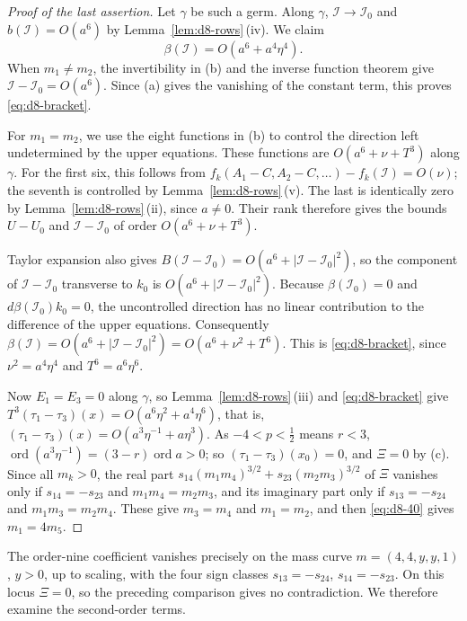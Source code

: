 \documentclass[11pt]{amsart}
\theoremstyle{definition}
\theoremstyle{remark}
\newcommand{\ord}{\operatorname{ord}}
\begin{document}
{}\begin{proof}[Proof of the last assertion]
Let $\gamma$ be such a germ.  Along $\gamma$, $\mathcal I\to\mathcal I_0$ and
$b(\mathcal I)=O(a^6)$ by Lemma~\ref{lem:d8-rows}\,(iv).  We claim
\begin{equation}\label{eq:d8-bracket}
  \beta(\mathcal I)=O(a^6+a^4\eta^4).
\end{equation}
When $m_1\ne m_2$, the invertibility in (b) and the inverse function theorem
give $\mathcal I-\mathcal I_0=O(a^6)$.  Since (a) gives the vanishing of the constant
term, this proves \eqref{eq:d8-bracket}.

For $m_1=m_2$, we use the eight functions in (b) to control the direction left
undetermined by the upper equations.  These functions are $O(a^6+\nu+T^3)$ along
$\gamma$.  For the first six, this follows from
$f_k(A_1-C,A_2-C,\dots)-f_k(\mathcal I)=O(\nu)$; the seventh is controlled by
Lemma~\ref{lem:d8-rows}\,(v).  The last is identically zero by
Lemma~\ref{lem:d8-rows}\,(ii), since $a\ne0$.  Their rank therefore gives the bounds
$U-U_0$ and $\mathcal I-\mathcal I_0$ of order $O(a^6+\nu+T^3)$.

Taylor expansion also gives
$B(\mathcal I-\mathcal I_0)=O(a^6+|\mathcal I-\mathcal I_0|^2)$, so the component of
$\mathcal I-\mathcal I_0$ transverse to $k_0$ is
$O(a^6+|\mathcal I-\mathcal I_0|^2)$.  Because $\beta(\mathcal I_0)=0$ and
$d\beta(\mathcal I_0)k_0=0$, the uncontrolled direction has no linear contribution
to the difference of the upper equations.  Consequently
$\beta(\mathcal I)=O(a^6+|\mathcal I-\mathcal I_0|^2)=O(a^6+\nu^2+T^6)$.
This is \eqref{eq:d8-bracket}, since $\nu^2=a^4\eta^4$ and $T^6=a^6\eta^6$.

Now $E_1=E_3=0$ along $\gamma$, so Lemma~\ref{lem:d8-rows}\,(iii) and \eqref{eq:d8-bracket}
give $T^3(\tau_1-\tau_3)(x)=O(a^6\eta^2+a^4\eta^6)$, that is,
$(\tau_1-\tau_3)(x)=O(a^3\eta^{-1}+a\eta^3)$.  As $-4<p<\frac12$ means $r<3$,
$\ord(a^3\eta^{-1})=(3-r)\ord a>0$; so $(\tau_1-\tau_3)(x_0)=0$, and $\Xi=0$ by (c).  Since all
$m_k>0$, the real part $s_{14}(m_1m_4)^{3/2}+s_{23}(m_2m_3)^{3/2}$ of $\Xi$ vanishes only if
$s_{14}=-s_{23}$ and $m_1m_4=m_2m_3$, and its imaginary part only if $s_{13}=-s_{24}$ and
$m_1m_3=m_2m_4$.  These give $m_3=m_4$ and $m_1=m_2$, and then \eqref{eq:d8-40} gives
$m_1=4m_5$.
\end{proof}

The order-nine coefficient vanishes precisely on the mass curve
$m=(4,4,y,y,1)$, $y>0$, up to scaling, with the four sign classes
$s_{13}=-s_{24}$, $s_{14}=-s_{23}$.  On this locus $\Xi=0$, so the preceding
comparison gives no contradiction.  We therefore examine the second-order terms.
\end{document}
